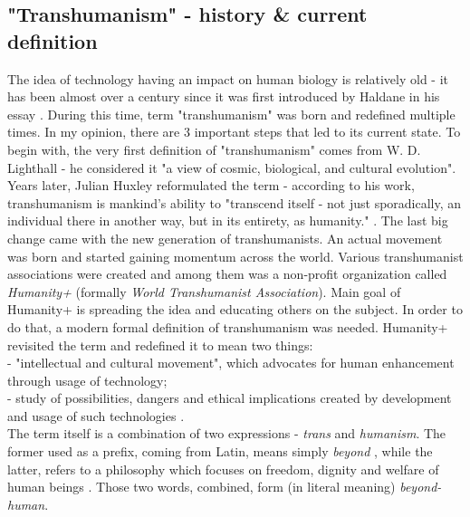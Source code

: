 \documentclass[12pt]{article}
\begin{document}
\subsection{"Transhumanism" - history \& current definition}
	The idea of technology having an impact on human biology is relatively old - it has been almost over a century since it was first introduced by Haldane in his essay \cite{haldane}. During this time, term "transhumanism" was born and redefined multiple times. In my opinion, there are 3 important steps that led to its current state. To begin with, the very first definition of "transhumanism" comes from W. D. Lighthall - he considered it "a view of cosmic, biological, and cultural evolution"\cite{transhumanismHistoryLighthall}. Years later, Julian Huxley reformulated the term - according to his work, transhumanism is mankind's ability to "transcend itself - not just sporadically, an individual there in another way, but in its entirety, as humanity." \cite{transhumanismHistoryHuxley}. The last big change came with the new generation of transhumanists. An actual movement was born and started gaining momentum across the world. Various transhumanist associations were created and among them was a non-profit organization called \emph{Humanity+} (formally \emph{World Transhumanist Association}). Main goal of Humanity+ is spreading the idea and educating others on the subject. In order to do that, a modern formal definition of transhumanism was needed. Humanity+ revisited the term and redefined it to mean two things: 
	\\- "intellectual and cultural movement", which advocates for human enhancement through usage of technology;
	\\- study of possibilities, dangers and ethical implications created by development and usage of such technologies \cite{transhumanistFAQ:1}.
	\\The term itself is a combination of two expressions - \emph{trans} and \emph{humanism}. The former used as a prefix, coming from Latin, means simply \emph{beyond} \cite{transTermDictionary}, while the latter, refers to a philosophy which focuses on freedom, dignity and welfare of human beings \cite{humanism:1}. Those two words, combined, form (in literal meaning) \emph{beyond-human}. 
\end{document}
